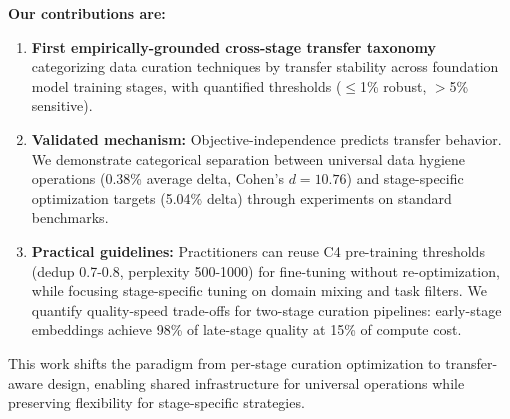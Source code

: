 \textbf{Our contributions are:}

\begin{enumerate}
\item \textbf{First empirically-grounded cross-stage transfer taxonomy} categorizing data curation techniques by transfer stability across foundation model training stages, with quantified thresholds ($\leq$1\% robust, $>$5\% sensitive).

\item \textbf{Validated mechanism:} Objective-independence predicts transfer behavior. We demonstrate categorical separation between universal data hygiene operations (0.38\% average delta, Cohen's $d=10.76$) and stage-specific optimization targets (5.04\% delta) through experiments on standard benchmarks.

\item \textbf{Practical guidelines:} Practitioners can reuse C4 pre-training thresholds (dedup 0.7-0.8, perplexity 500-1000) for fine-tuning without re-optimization, while focusing stage-specific tuning on domain mixing and task filters. We quantify quality-speed trade-offs for two-stage curation pipelines: early-stage embeddings achieve 98\% of late-stage quality at 15\% of compute cost.
\end{enumerate}

This work shifts the paradigm from per-stage curation optimization to transfer-aware design, enabling shared infrastructure for universal operations while preserving flexibility for stage-specific strategies.
